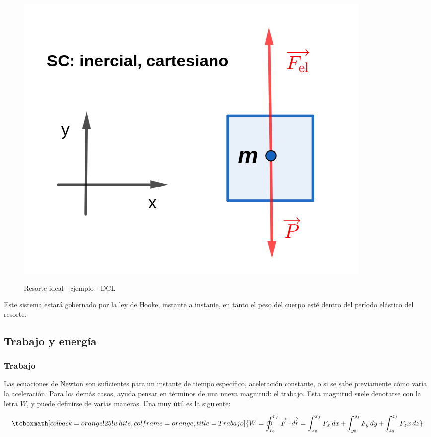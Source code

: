 \documentclass{article}
\begin{document}
\begin{figure}[ht]
\centering
\caption{Resorte ideal - ejemplo - DCL}
\includegraphics[scale=0.8]{../../common/img/62.01/theory/15-dynamics-spring-03.png}
\label{fig:spring-03}
\end{figure}

Este sistema estará gobernado por la ley de Hooke, instante a instante, en tanto el peso del cuerpo esté dentro del período elástico del resorte.

\subsection{Trabajo y energía}

\subsubsection{Trabajo}

Las ecuaciones de Newton son suficientes para un instante de tiempo específico, aceleración constante, o si se sabe previamente cómo varía la aceleración. Para los demás casos, ayuda pensar en términos de una nueva magnitud: el trabajo. Esta magnitud suele denotarse con la letra $W$, y puede definirse de varias maneras. Una muy útil es la siguiente:

\begin{equation}
\tcboxmath[colback=orange!25!white,colframe=orange,title=Trabajo]{
W = \oint_{r_0}^{r_f} \overrightarrow{F} \cdot \overrightarrow{\mathop{dr}} = \int_{x_0}^{x_f} F_x \mathop{dx} + \int_{y_0}^{y_f} F_y \mathop{dy} + \int_{z_0}^{z_f} F_zx \mathop{dz}
}
\end{equation}
\end{document}

